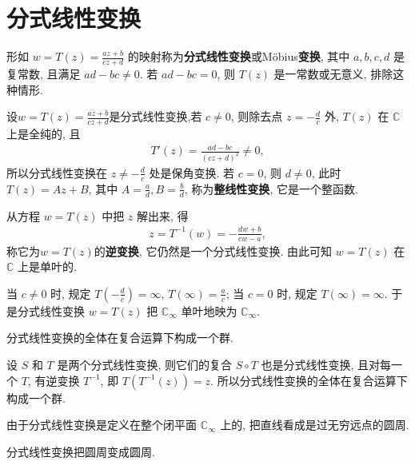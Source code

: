 \documentclass[../../main.tex]{subfiles}%
\begin{document}
\section{分式线性变换}\label{section:2.2.5}

\begin{definition}
形如 $w = T(z) = \frac{az + b}{cz + d}$ 的映射称为\textbf{分式线性变换}或M\"obius\textbf{变换}, 其中 $a,b,c,d$ 是复常数, 且满足 $ad-bc \neq 0$. 若 $ad-bc = 0$, 则 $T(z)$ 是一常数或无意义, 排除这种情形.
\end{definition}

\begin{theorem}
设$w = T(z) = \frac{az + b}{cz + d}$是分式线性变换,若 $c \neq 0$, 则除去点 $z = -\frac{d}{c}$ 外, $T(z)$ 在 $\mathbb{C}$ 上是全纯的, 且
\begin{align*}
T'(z) = \frac{ad-bc}{(cz+d)^2} \neq 0,
\end{align*}
所以分式线性变换在 $z \neq -\frac{d}{c}$ 处是保角变换. 若 $c = 0$, 则 $d \neq 0$, 此时 $T(z) = Az+B$, 其中 $A = \frac{a}{d}, B = \frac{b}{d}$, 称为\textbf{整线性变换}, 它是一个整函数.

从方程 $w = T(z)$ 中把 $z$ 解出来, 得
\begin{align*}
z = T^{-1}(w) = -\frac{dw+b}{cw-a},
\end{align*}
称它为$w = T(z)$的\textbf{逆变换}, 它仍然是一个分式线性变换. 由此可知 $w = T(z)$ 在 $\mathbb{C}$ 上是单叶的.

当 $c \neq 0$ 时, 规定 $T\left(-\frac{d}{c}\right) = \infty$, $T(\infty) = \frac{a}{c}$; 当 $c = 0$ 时, 规定 $T(\infty) = \infty$. 于是分式线性变换 $w = T(z)$ 把 $\mathbb{C}_\infty$ 单叶地映为 $\mathbb{C}_\infty$.

分式线性变换的全体在复合运算下构成一个群.
\end{theorem}
\begin{remark}
设 $S$ 和 $T$ 是两个分式线性变换, 则它们的复合 $S \circ T$ 也是分式线性变换, 且对每一个 $T$, 有逆变换 $T^{-1}$, 即 $T(T^{-1}(z)) = z$. 所以分式线性变换的全体在复合运算下构成一个群.
\end{remark}
\begin{remark}
由于分式线性变换是定义在整个闭平面 $\mathbb{C}_\infty$ 上的, 把直线看成是过无穷远点的圆周.
\end{remark}

\begin{theorem}
分式线性变换把圆周变成圆周.
\end{theorem}
\end{document}
